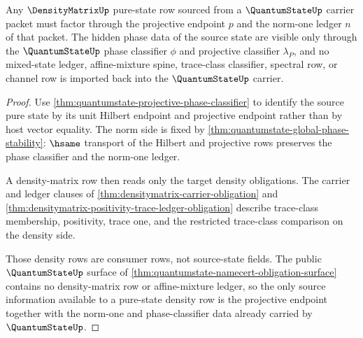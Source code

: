 \begin{theorem}
\label{thm:quantumstate-densitymatrix-pure-state-boundary}
Any $\DensityMatrixUp$ pure-state row sourced from a $\QuantumStateUp$ carrier
packet must factor through the projective endpoint $p$ and the norm-one ledger
$n$ of that packet. The hidden phase data of the source state are visible only
through the $\QuantumStateUp$ phase classifier $\phi$ and projective classifier
$\lambda_P$, and no mixed-state ledger, affine-mixture spine, trace-class
classifier, spectral row, or channel row is imported back into the
$\QuantumStateUp$ carrier.
\end{theorem}
\begin{proof}
Use \autoref{thm:quantumstate-projective-phase-classifier} to identify the
source pure state by its unit Hilbert endpoint and projective endpoint rather
than by host vector equality. The norm side is fixed by
\autoref{thm:quantumstate-global-phase-stability}: $\hsame$ transport of the
Hilbert and projective rows preserves the phase classifier and the norm-one
ledger.

A density-matrix row then reads only the target density obligations. The
carrier and ledger clauses of \autoref{thm:densitymatrix-carrier-obligation}
and \autoref{thm:densitymatrix-positivity-trace-ledger-obligation} describe
trace-class membership, positivity, trace one, and the restricted
trace-class comparison on the density side.

Those density rows are consumer rows, not source-state fields. The public
$\QuantumStateUp$ surface of
\autoref{thm:quantumstate-namecert-obligation-surface} contains no
density-matrix row or affine-mixture ledger, so the only source information
available to a pure-state density row is the projective endpoint together
with the norm-one and phase-classifier data already carried by
$\QuantumStateUp$.
\end{proof}

